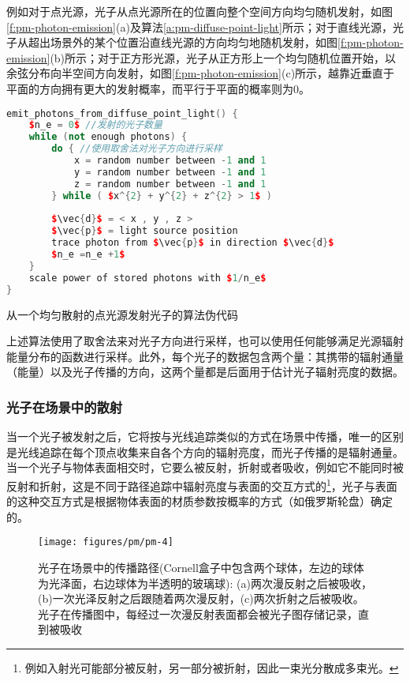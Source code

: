 例如对于点光源，光子从点光源所在的位置向整个空间方向均匀随机发射，如图\ref{f:pm-photon-emission}(a)及算法\ref{a:pm-diffuse-point-light}所示；对于直线光源，光子从超出场景外的某个位置沿直线光源的方向均匀地随机发射，如图\ref{f:pm-photon-emission}(b)所示；对于正方形光源，光子从正方形上一个均匀随机位置开始，以余弦分布向半空间方向发射，如图\ref{f:pm-photon-emission}(c)所示，越靠近垂直于平面的方向拥有更大的发射概率，而平行于平面的概率则为0。

\begin{algorithm}
\begin{lstlisting}[language=C++, mathescape]
emit_photons_from_diffuse_point_light() {
	$n_e = 0$ //发射的光子数量
 	while (not enough photons) {
		do { //使用取舍法对光子方向进行采样
 			x = random number between -1 and 1
			y = random number between -1 and 1
			z = random number between -1 and 1
		} while ( $x^{2} + y^{2} + z^{2} > 1$ )
 			
		$\vec{d}$ = < x , y , z >
		$\vec{p}$ = light source position
		trace photon from $\vec{p}$ in direction $\vec{d}$ 
 		$n_e =n_e +1$
	}
	scale power of stored photons with $1/n_e$ 
}
\end{lstlisting}
\caption{从一个均匀散射的点光源发射光子的算法伪代码}
\label{a:pm-diffuse-point-light}
\end{algorithm}

上述算法使用了取舍法来对光子方向进行采样，也可以使用任何能够满足光源辐射能量分布的函数进行采样。此外，每个光子的数据包含两个量：其携带的辐射通量（能量）以及光子传播的方向，这两个量都是后面用于估计光子辐射亮度的数据。





\subsubsection{光子在场景中的散射}
当一个光子被发射之后，它将按与光线追踪类似的方式在场景中传播，唯一的区别是光线追踪在每个顶点收集来自各个方向的辐射亮度，而光子传播的是辐射通量。当一个光子与物体表面相交时，它要么被反射，折射或者吸收，例如它不能同时被反射和折射，这是不同于路径追踪中辐射亮度与表面的交互方式的\footnote{例如入射光可能部分被反射，另一部分被折射，因此一束光分散成多束光。}，光子与表面的这种交互方式是根据物体表面的材质参数按概率的方式（如俄罗斯轮盘）确定的。

\begin{figure}
\sidecaption
	\texttt{[image: figures/pm/pm-4]}
	\caption{光子在场景中的传播路径(Cornell盒子中包含两个球体，左边的球体为光泽面，右边球体为半透明的玻璃球): (a)两次漫反射之后被吸收，(b)一次光泽反射之后跟随着两次漫反射，(c)两次折射之后被吸收。光子在传播图中，每经过一次漫反射表面都会被光子图存储记录，直到被吸收}
\end{figure}

